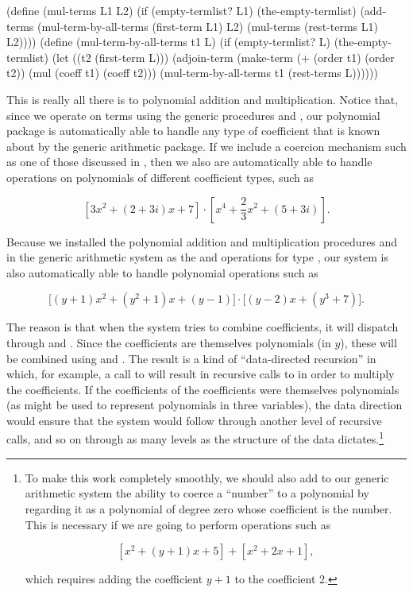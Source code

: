 \begin{codeBlock}
(define (mul-terms L1 L2)
  (if (empty-termlist? L1)
      (the-empty-termlist)
      (add-terms (mul-term-by-all-terms (first-term L1)
                                        L2)
                 (mul-terms (rest-terms L1)
                            L2))))
(define (mul-term-by-all-terms t1 L)
  (if (empty-termlist? L)
      (the-empty-termlist)
      (let ((t2 (first-term L)))
        (adjoin-term
         (make-term (+ (order t1) (order t2))
                    (mul (coeff t1) (coeff t2)))
         (mul-term-by-all-terms t1 (rest-terms L))))))
\end{codeBlock}

\noindent
This is really all there is to polynomial addition and multiplication.  Notice
that, since we operate on terms using the generic procedures  and
, our polynomial package is automatically able to handle any type of
coefficient that is known about by the generic arithmetic package.  If we
include a coercion mechanism such as one of those discussed in
, then we also are automatically able to handle operations on
polynomials of different coefficient types, such as

$$ [3x^2 + (2 + 3i)x + 7] \cdot \! \left[ x^4 + \frac{2}{3} x^2 + (5 + 3i) \right]\!. $$

Because we installed the polynomial addition and multiplication procedures
 and  in the generic arithmetic system as the
 and  operations for type , our system is
also automatically able to handle polynomial operations such as

$$ \Big[(y + 1)x^2 + (y^2 + 1)x + (y - 1)\Big] \cdot \Big[(y - 2)x + (y^3 + 7)\Big]\!. $$

The reason is that when the system tries to combine coefficients, it will
dispatch through  and .  Since the coefficients are
themselves polynomials (in \( y \)), these will be combined using 
and .  The result is a kind of ``data-directed recursion'' in
which, for example, a call to  will result in recursive calls to
 in order to multiply the coefficients.  If the coefficients of
the coefficients were themselves polynomials (as might be used to represent
polynomials in three variables), the data direction would ensure that the
system would follow through another level of recursive calls, and so on through
as many levels as the structure of the data dictates.\footnote{To make this
work completely smoothly, we should also add to our generic arithmetic system
the ability to coerce a ``number'' to a polynomial by regarding it as a
polynomial of degree zero whose coefficient is the number.  This is necessary
if we are going to perform operations such as

$$ [x^2 + (y + 1)x + 5] + [x^2 + 2x + 1], $$

\noindent
which requires adding the coefficient \( y + 1 \) to the coefficient 2.}

